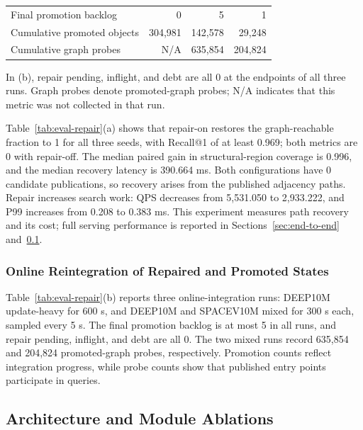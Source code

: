 \documentclass[sigconf,pbalance]{acmart}
\begin{document}
\begin{table}[t]
\begin{tabular*}{\columnwidth}{@{\extracolsep{\fill}}lrrr@{}}
Final promotion backlog & 0 & 5 & 1 \\
Cumulative promoted objects & 304,981 & 142,578 & 29,248 \\
Cumulative graph probes & N/A & 635,854 & 204,824 \\
    \bottomrule
  \end{tabular*}
  \par\smallskip
  \begin{minipage}{\columnwidth}
\scriptsize In (b), repair pending, inflight, and debt are all 0 at the endpoints of all three runs. Graph probes denote promoted-graph probes; N/A indicates that this metric was not collected in that run.
  \end{minipage}
\end{table}

Table~\ref{tab:eval-repair}(a) shows that repair-on restores the graph-reachable fraction to 1 for all three seeds, with Recall@1 of at least 0.969; both metrics are 0 with repair-off. The median paired gain in structural-region coverage is 0.996, and the median recovery latency is 390.664 ms. Both configurations have 0 candidate publications, so recovery arises from the published adjacency paths. Repair increases search work: QPS decreases from 5,531.050 to 2,933.222, and P99 increases from 0.208 to 0.383 ms. This experiment measures path recovery and its cost; full serving performance is reported in Sections~\ref{sec:end-to-end} and~\ref{sec:architectural-ablation}.

\subsubsection{Online Reintegration of Repaired and Promoted States}
\label{sec:promoted-traversal}

Table~\ref{tab:eval-repair}(b) reports three online-integration runs: DEEP10M update-heavy for 600 s, and DEEP10M and SPACEV10M mixed for 300 s each, sampled every 5 s. The final promotion backlog is at most 5 in all runs, and repair pending, inflight, and debt are all 0. The two mixed runs record 635,854 and 204,824 promoted-graph probes, respectively. Promotion counts reflect integration progress, while probe counts show that published entry points participate in queries.

\subsection{Architecture and Module Ablations}
\label{sec:architectural-ablation}
\end{document}
